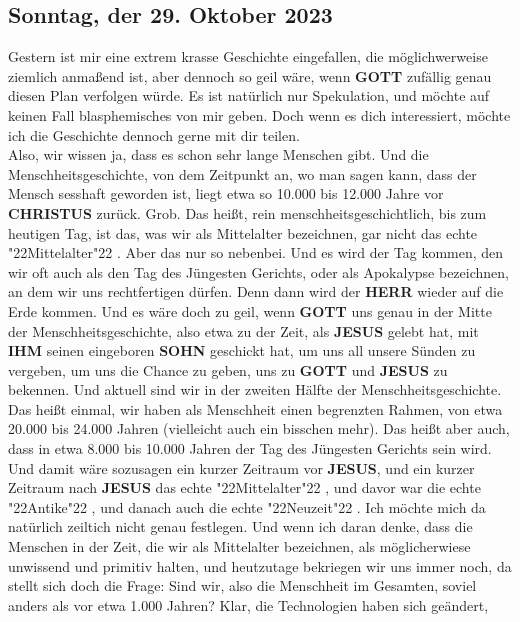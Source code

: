 \documentclass[10pt,a5paper]{article}
\newcommand{\Christus}[0]{\textbf{CHRISTUS}}
\newcommand{\Gott}[0]{\textbf{GOTT}}
\newcommand{\Herr}[0]{\textbf{HERR}}
\newcommand{\Ihm}[0]{\textbf{IHM}}
\newcommand{\Jesus}[0]{\textbf{JESUS}}
\newcommand{\Sohn}[0]{\textbf{SOHN}}
\newcommand{\q}[1]{\char"22{#1}\char"22 }
\begin{document}
	\subsection{Sonntag, der 29. Oktober 2023}
		Gestern ist mir eine extrem krasse Geschichte eingefallen,
		die m\"oglichwerweise ziemlich anma{\ss}end ist,
		aber dennoch so geil w\"are,
		wenn {\Gott} zuf\"allig genau diesen Plan verfolgen w\"urde.
		Es ist nat\"urlich nur Spekulation,
		und m\"ochte auf keinen Fall blasphemisches von mir geben.
		Doch wenn es dich interessiert,
		m\"ochte ich die Geschichte dennoch gerne mit dir teilen.
		\\
		Also,
		wir wissen ja,
		dass es schon sehr lange Menschen gibt.
		Und die Menschheitsgeschichte,
		von dem Zeitpunkt an,
		wo man sagen kann,
		dass der Mensch sesshaft geworden ist,
		liegt etwa so 10.000 bis 12.000 Jahre vor {\Christus} zur\"uck.
		Grob.
		Das hei{\ss}t,
		rein menschheitsgeschichtlich,
		bis zum heutigen Tag,
		ist das,
		was wir als Mittelalter bezeichnen,
		gar nicht das echte \q{Mittelalter}.
		Aber das nur so nebenbei.
		Und es wird der Tag kommen,
		den wir oft auch als den Tag des J\"ungesten Gerichts,
		oder als Apokalypse bezeichnen,
		an dem wir uns rechtfertigen d\"urfen.
		Denn dann wird der {\Herr} wieder auf die Erde kommen.
		Und es w\"are doch zu geil,
		wenn {\Gott} uns genau in der Mitte der Menschheitsgeschichte,
		also etwa zu der Zeit,
		als {\Jesus} gelebt hat,
		mit {\Ihm} seinen eingeboren {\Sohn} geschickt hat,
		um uns all unsere S\"unden zu vergeben,
		um uns die Chance zu geben,
		uns zu {\Gott} und {\Jesus} zu bekennen.
		Und aktuell sind wir in der zweiten H\"alfte der Menschheitsgeschichte.
		Das hei{\ss}t einmal,
		wir haben als Menschheit einen begrenzten Rahmen,
		von etwa 20.000 bis 24.000 Jahren
		(vielleicht auch ein bisschen mehr).
		Das hei{\ss}t aber auch,
		dass in etwa 8.000 bis 10.000 Jahren der Tag des J\"ungesten Gerichts sein wird.
		Und damit w\"are sozusagen ein kurzer Zeitraum vor {\Jesus},
		und ein kurzer Zeitraum nach {\Jesus} das echte \q{Mittelalter},
		und davor war die echte \q{Antike},
		und danach auch die echte \q{Neuzeit}.
		Ich m\"ochte mich da nat\"urlich zeiltich nicht genau festlegen.
		Und wenn ich daran denke,
		dass die Menschen in der Zeit,
		die wir als Mittelalter bezeichnen,
		als m\"oglicherwiese unwissend und primitiv halten,
		und heutzutage bekriegen wir uns immer noch,
		da stellt sich doch die Frage:
		Sind wir,
		also die Menschheit im Gesamten,
		soviel anders als vor etwa 1.000 Jahren?
		Klar,
		die Technologien haben sich ge\"andert,
\end{document}

